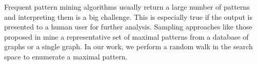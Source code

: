 Frequent pattern mining algorithms usually return a large number of
patterns and interpreting them is a big challenge. This is especially
true if the output is presented to a human user for further analysis.
Sampling approaches like those proposed in
\cite{2009-graphsampling,2012-kais,RAM2008} mine a representative set of
maximal patterns from a database of graphs or a single graph. 
In our work, we perform a random walk in the search space
to enumerate a maximal pattern.



